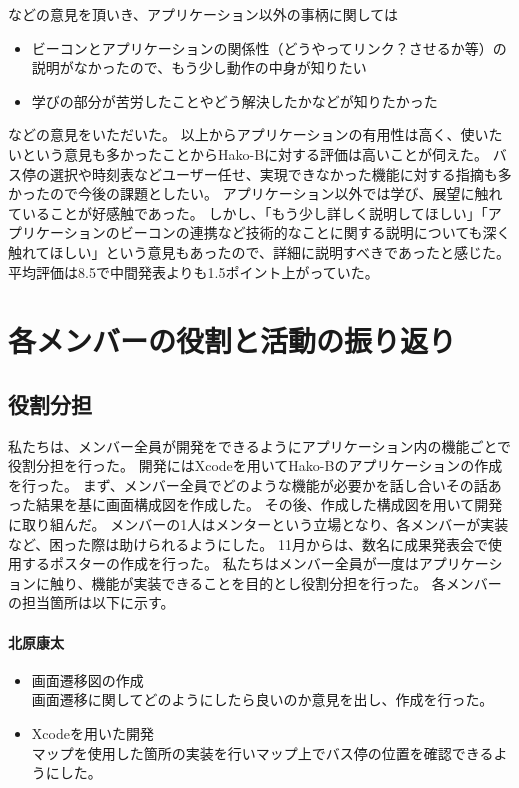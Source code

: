 \documentclass[openany,11pt,papersize]{jsbook}
\begin{document}
などの意見を頂いき、アプリケーション以外の事柄に関しては
\begin{itemize}

\item ビーコンとアプリケーションの関係性（どうやってリンク？させるか等）の説明がなかったので、もう少し動作の中身が知りたい
\item 学びの部分が苦労したことやどう解決したかなどが知りたかった

\end{itemize}
などの意見をいただいた。
以上からアプリケーションの有用性は高く、使いたいという意見も多かったことからHako-Bに対する評価は高いことが伺えた。
バス停の選択や時刻表などユーザー任せ、実現できなかった機能に対する指摘も多かったので今後の課題としたい。
アプリケーション以外では学び、展望に触れていることが好感触であった。
しかし、「もう少し詳しく説明してほしい」「アプリケーションのビーコンの連携など技術的なことに関する説明についても深く触れてほしい」という意見もあったので、詳細に説明すべきであったと感じた。
平均評価は8.5で中間発表よりも1.5ポイント上がっていた。



\chapter{各メンバーの役割と活動の振り返り}
\section{役割分担}
私たちは、メンバー全員が開発をできるようにアプリケーション内の機能ごとで役割分担を行った。
開発にはXcodeを用いてHako-Bのアプリケーションの作成を行った。
まず、メンバー全員でどのような機能が必要かを話し合いその話あった結果を基に画面構成図を作成した。
その後、作成した構成図を用いて開発に取り組んだ。
メンバーの1人はメンターという立場となり、各メンバーが実装など、困った際は助けられるようにした。
11月からは、数名に成果発表会で使用するポスターの作成を行った。
私たちはメンバー全員が一度はアプリケーションに触り、機能が実装できることを目的とし役割分担を行った。
各メンバーの担当箇所は以下に示す。

\subsubsection{北原康太}
\begin{itemize}
  \item 画面遷移図の作成\\
    画面遷移に関してどのようにしたら良いのか意見を出し、作成を行った。
	\item Xcodeを用いた開発\\
    マップを使用した箇所の実装を行いマップ上でバス停の位置を確認できるようにした。
\end{itemize}
\end{document}
